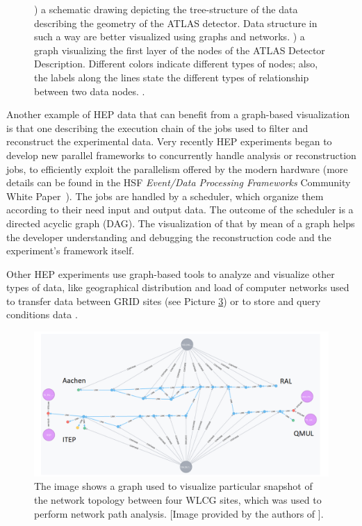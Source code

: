 \documentclass[12pt,a4paper]{article}
\begin{document}
\begin{figure}
\begin{subfigure}[b]{0.6\textwidth}
		\caption[A graph visualizing the ATLAS geometry data]{}
		\label{fig:atlasgeo2}
	\end{subfigure}
	\caption[Using 3D editing software for HEP Geometry]
	{\small {}) a schematic drawing depicting the tree-structure of the data describing the geometry of the ATLAS detector. Data structure in such a way are better visualized using graphs and networks. ) a graph visualizing the first layer of the nodes of the ATLAS Detector Description. Different colors indicate different types of nodes; also, the labels along the lines state the different types of relationship between two data nodes. \cite{ATLASGeoModel2017}.}
	\label{fig:atlasgeotree}
\end{figure}



Another example of HEP data that can benefit from a graph-based visualization is that one describing the execution chain of the jobs
used to filter and reconstruct the experimental data. Very recently HEP experiments began to develop new parallel frameworks
to concurrently handle analysis or reconstruction jobs, to efficiently exploit the parallelism offered by the modern hardware
(more details can be found in the HSF \textit{Event/Data Processing Frameworks} Community White Paper~\cite{HSF-CWP-2017-08}).
The jobs are handled by a scheduler, which organize them according to their need input and output data. The outcome of the scheduler
is a directed acyclic graph (DAG). The visualization of that by mean of a graph helps the developer understanding and debugging the
reconstruction code and the experiment’s framework itself.

Other HEP experiments use graph-based tools to analyze and visualize other types of data, like geographical distribution and load of computer
networks used to transfer data between GRID sites \cite{neo4jnetworkstudy} (see Picture \ref{fig:networkstudy})
 or to store and query conditions data \cite{Clemencic:2012cw}.

\begin{figure}
	\centering
	\includegraphics[width=0.95\linewidth]{proximity.png}
	\caption[Graphs used to visualize network topologies]
	{\small The image shows a graph used to visualize particular snapshot of the network topology between four WLCG sites, which was used to perform network path analysis. [Image provided by the authors of \cite{neo4jnetworkstudy}].}
	\label{fig:networkstudy}
\end{figure}
\end{document}
